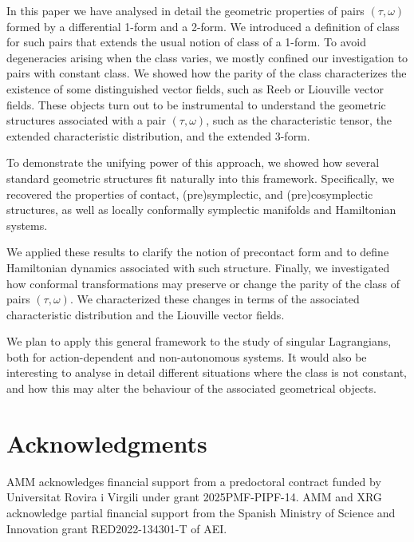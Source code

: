 \documentclass[11pt,twoside]{article}
\theoremstyle{plain}
\theoremstyle{definition}
\begin{document}
In this paper we have analysed in detail the geometric properties of pairs 
$(\tau,\omega)$
formed by a differential 1-form and a 2-form.
We introduced a definition of class for such pairs 
that extends the usual notion of class of a 1-form. 
To avoid degeneracies arising when the class varies, 
we mostly confined our investigation to pairs with constant class.
We showed how the parity of the class characterizes the existence of some distinguished vector fields, such as Reeb or Liouville vector fields. 
These objects turn out to be instrumental to understand the geometric structures associated with a pair $(\tau,\omega)$, 
such as the characteristic tensor, the extended characteristic distribution, and the extended 3-form. 

To demonstrate the unifying power of this approach, 
we showed how several standard geometric structures fit naturally into this framework. 
Specifically, we recovered the properties of contact, (pre)symplectic, and (pre)cosymplectic structures, as well as locally conformally symplectic manifolds and Hamiltonian systems.

We applied these results to 
clarify the notion of precontact form
and to define Hamiltonian dynamics associated with such structure. 
Finally, we investigated how conformal transformations 
may preserve or change the parity of the class of pairs $(\tau,\omega)$. 
We characterized these changes in terms of the associated characteristic distribution and the Liouville vector fields. 

We plan to apply this general framework to the study of singular Lagrangians, 
both for action-dependent and non-autonomous systems. 
It would also be interesting to analyse in detail different situations where the class is not constant, 
and how this may alter the behaviour of the associated geometrical objects.




\section*{Acknowledgments}

AMM acknowledges financial support from a predoctoral contract funded by Universitat Rovira i Virgili under grant 2025PMF-PIPF-14.
AMM and XRG acknowledge partial financial support from the Spanish Ministry of Science and Innovation grant RED2022-134301-T of AEI.



{\small
%

}
\end{document}
